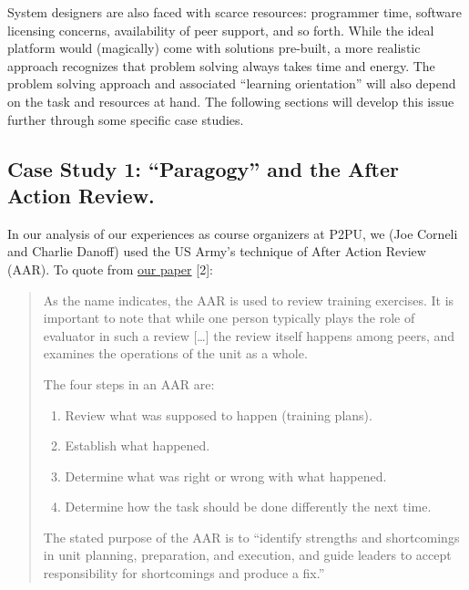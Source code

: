 System designers are also faced with scarce resources: programmer time,
software licensing concerns, availability of peer support, and so forth.
While the ideal platform would (magically) come with solutions
pre-built, a more realistic approach recognizes that problem solving
always takes time and energy. The problem solving approach and
associated ``learning orientation'' will also depend on the task and
resources at hand. The following sections will develop this issue
further through some specific case studies.

\subsection{Case Study 1: ``Paragogy'' and the After
Action Review.}

In our analysis of our experiences as course organizers at P2PU, we (Joe
Corneli and Charlie Danoff) used the US Army's technique of After Action
Review (AAR). To quote from
\href{http://paragogy.net/ParagogyPaper2}{our paper} {[}2{]}:

\begin{quote}
As the name indicates, the AAR is used to review training exercises. It
is important to note that while one person typically plays the role of
evaluator in such a review {[}\ldots{}{]} the review itself happens
among peers, and examines the operations of the unit as a whole.

The four steps in an AAR are:

\begin{enumerate}
\itemsep1pt\parskip0pt
\item
  Review what was supposed to happen (training plans).
\item
  Establish what happened.
\item
  Determine what was right or wrong with what happened.
\item
  Determine how the task should be done differently the next time.
\end{enumerate}

The stated purpose of the AAR is to ``identify strengths and
shortcomings in unit planning, preparation, and execution, and guide
leaders to accept responsibility for shortcomings and produce a fix.''
\end{quote}

